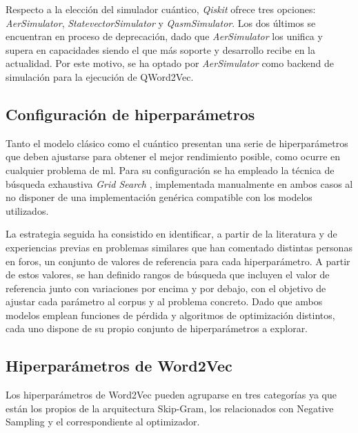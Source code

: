 Respecto a la elección del simulador cuántico, \textit{Qiskit} ofrece tres opciones: \textit{AerSimulator}, \textit{StatevectorSimulator} y \textit{QasmSimulator}. Los dos últimos se encuentran en proceso de deprecación, dado que \textit{AerSimulator} los unifica y supera en capacidades siendo el que más soporte y desarrollo recibe en la actualidad. Por este motivo, se ha optado por \textit{AerSimulator} como backend de simulación para la ejecución de QWord2Vec.

\subsection{Configuración de hiperparámetros}

Tanto el modelo clásico como el cuántico presentan una serie de hiperparámetros que deben ajustarse para obtener el mejor rendimiento posible, como ocurre en cualquier problema de \gls{ml}. Para su configuración se ha empleado la técnica de búsqueda exhaustiva \textit{Grid Search} \cite{dremio_grid_2026}, implementada manualmente en ambos casos al no disponer de una implementación genérica compatible con los modelos utilizados.

La estrategia seguida ha consistido en identificar, a partir de la literatura y de experiencias previas en problemas similares que han comentado distintas personas en foros, un conjunto de valores de referencia para cada hiperparámetro. A partir de estos valores, se han definido rangos de búsqueda que incluyen el valor de referencia junto con variaciones por encima y por debajo, con el objetivo de ajustar cada parámetro al corpus y al problema concreto. Dado que ambos modelos emplean funciones de pérdida y algoritmos de optimización distintos, cada uno dispone de su propio conjunto de hiperparámetros a explorar.

\subsection{Hiperparámetros de Word2Vec}

Los hiperparámetros de Word2Vec pueden agruparse en tres categorías ya que están los propios de la arquitectura Skip-Gram, los relacionados con Negative Sampling y el correspondiente al optimizador.

